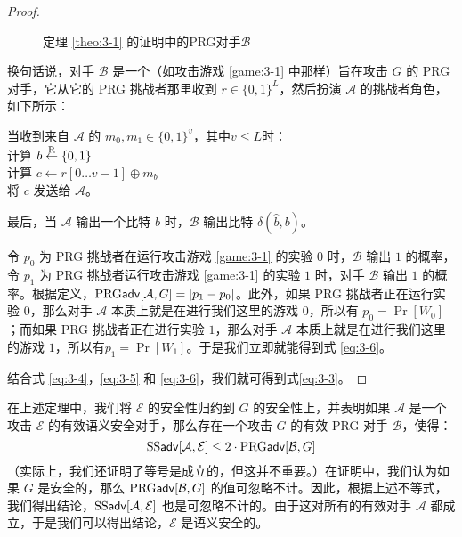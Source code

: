 \begin{proof}
\begin{figure}
	\centering
	
	\caption{定理 \ref{theo:3-1} 的证明中的PRG对手$\mathcal{B}$}
	\label{fig:3-4}
\end{figure}

换句话说，对手 $\mathcal B$ 是一个（如攻击游戏 \ref{game:3-1} 中那样）旨在攻击 $G$ 的 PRG 对手，它从它的 PRG 挑战者那里收到 $r\in\{0,1\}^L$，然后扮演 $\mathcal A$ 的挑战者角色，如下所示：

\vspace*{5pt}

\hspace*{5pt} 当收到来自 $\mathcal A$ 的 $m_0,m_1\in\{0,1\}^v$，其中$v\leq L$时：\\
\hspace*{50pt} 计算 $b\overset{\rm R}\leftarrow\{0,1\}$\\
\hspace*{50pt} 计算 $c\leftarrow r[0\dots v-1]\oplus m_b$\\
\hspace*{50pt} 将 $c$ 发送给 $\mathcal A$。

\vspace*{5pt}

\noindent
最后，当 $\mathcal A$ 输出一个比特 $\hat b$ 时，$\mathcal B$ 输出比特 $\delta(\hat b,b)$。

令 $p_0$ 为 PRG 挑战者在运行攻击游戏 \ref{game:3-1} 的实验 $0$ 时，$\mathcal B$ 输出 $1$ 的概率，令 $p_1$ 为 PRG 挑战者运行攻击游戏 \ref{game:3-1} 的实验 $1$ 时，对手 $\mathcal B$ 输出 $1$ 的概率。根据定义，${\rm PRG\mathsf{adv}}[\mathcal{A},G]=|p_1-p_0|$。此外，如果 PRG 挑战者正在运行实验 $0$，那么对手 $\mathcal A$ 本质上就是在进行我们这里的游戏 $0$，所以有 $p_0=\Pr[W_0]$；而如果 PRG 挑战者正在进行实验  $1$，那么对手 $\mathcal A$ 本质上就是在进行我们这里的游戏 $1$，所以有$p_1=\Pr[W_1]$。于是我们立即就能得到式 \ref{eq:3-6}。

结合式 \ref{eq:3-4}，\ref{eq:3-5} 和 \ref{eq:3-6}，我们就可得到式\ref{eq:3-3}。
\end{proof}

在上述定理中，我们将 $\mathcal E$ 的安全性归约到 $G$ 的安全性上，并表明如果 $\mathcal A$ 是一个攻击 $\mathcal E$ 的有效语义安全对手，那么存在一个攻击 $G$ 的有效 PRG 对手 $\mathcal B$，使得：
$$
{\rm SS\mathsf{adv}}[\mathcal{A},\mathcal{E}]\leq 2\cdot{\rm PRG\mathsf{adv}}[\mathcal{B},G]
$$
（实际上，我们还证明了等号是成立的，但这并不重要。）在证明中，我们认为如果 $G$ 是安全的，那么 ${\rm PRG\mathsf{adv}}[\mathcal{B},G]$ 的值可忽略不计。因此，根据上述不等式，我们得出结论，${\rm SS\mathsf{adv}}[\mathcal{A},\mathcal{E}]$ 也是可忽略不计的。由于这对所有的有效对手 $\mathcal A$ 都成立，于是我们可以得出结论，$\mathcal E$ 是语义安全的。

